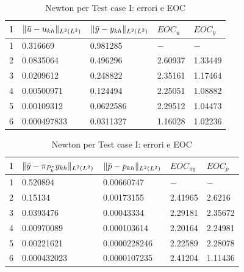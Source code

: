 \begin{table}
\caption{Newton per Test case I: errori e EOC }
\label{newtonI}
\centering

\begin{tabular}{cllll}
\toprule
{l}           &  {$ \lVert\bar{u}-u_{kh}\rVert_{L^2(L^2)} $} &  {$ \lVert\bar{y}-y_{kh}\rVert_{L^2(L^2)} $} &  {$ EOC_u $} &  {$ EOC_y $} \\
\midrule
1            &  0.316669 &  0.981285 &  {$-$} &  {$-$} \\
2            &  0.0835064 &  0.496296 &  2.60937 &  1.33449 \\
3            &  0.0209612 &  0.248822 &  2.35161 &  1.17464 \\
4            &  0.00500971 &  0.124494  &  2.25051 &  1.08882 \\
5            &  0.00109312 &  0.0622586 &  2.29512 &  1.04473 \\
6            &  0.000497833 &  0.0311327 &  1.16028 &  1.02236 \\
\bottomrule
\end{tabular}              

\end{table}


\begin{table}
\caption{Newton per Test case I: errori e EOC }
\label{newtonIbis}
\centering

\begin{tabular}{cllll}
\toprule
{l}           &  {$ \lVert\bar{y}-\pi_{P^*_k}y_{kh}\rVert_{L^2(L^2)} $} & {$ \lVert\bar{p}-p_{kh}\rVert_{L^2(L^2)} $} &  {$ EOC_{\pi y} $}  &  {$ EOC_p $} \\
\midrule
1            &  0.520894 &  0.00660747 &  {$-$} &  {$-$} \\
2            &  0.15134 &  0.00173155 &  2.41965 &  2.6216 \\
3            &  0.0393476 &  0.00043334 &  2.29181 &  2.35672 \\
4            &  0.00970089 &  0.000103614 &  2.20164 &  2.24981 \\
5            &  0.00221621 &  0.0000228246 &  2.22589 &  2.28078 \\
6            &  0.000432023 &  0.0000107235 &  2.41204 &  1.11436 \\
\bottomrule
\end{tabular}              

\end{table}

